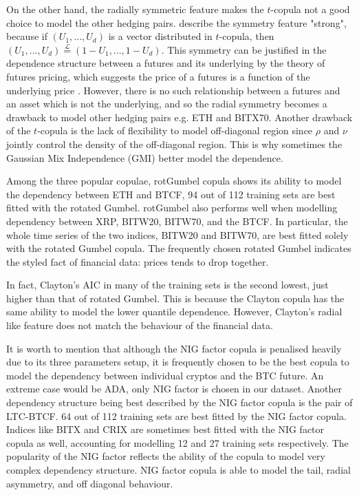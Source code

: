 On the other hand, the radially symmetric feature makes the $t$-copula not a good choice to model the other hedging pairs.
\cite{demarta2005t} describe the symmetry feature "strong", because if $(U_1, ..., U_d)$ is a vector distributed in $t$-copula,
then $(U_1, ..., U_d) \overset{\mathcal{L}}= (1-U_1, ..., 1-U_d)$.
This symmetry can be justified in the dependence structure between a futures and its underlying by the theory of futures pricing,
which suggests the price of a futures is a function of the underlying price \citep{hull2003options}.
However, there is no such relationship between a futures and an asset which is not the underlying, and so the radial symmetry becomes a drawback to model other hedging pairs e.g. ETH and BITX70.
Another drawback of the $t$-copula is the lack of flexibility to model off-diagonal region since $\rho$ and $\nu$ jointly control the density of the off-diagonal region.
This is why sometimes the Gaussian Mix Independence (GMI) better model the dependence.  \medskip

Among the three popular copulae, rotGumbel copula shows its ability to model the dependency between ETH and BTCF,
94 out of 112 training sets are best fitted with the rotated Gumbel.
rotGumbel also performs well when modelling dependency between XRP, BITW20, BITW70, and the BTCF.
In particular, the whole time series of the two indices, BITW20 and BITW70, are best fitted solely with the rotated Gumbel copula.
The frequently chosen rotated Gumbel indicates the styled fact of financial data: prices tends to drop together.  \medskip

In fact, Clayton's AIC in many of the training sets is the second lowest, just higher than that of rotated Gumbel.
This is because the Clayton copula has the same ability to model the lower quantile dependence.
However, Clayton's radial like feature does not match the behaviour of the financial data. \medskip

It is worth to mention that although the NIG factor copula is penalised heavily due to its three parameters setup,
it is frequently chosen to be the best copula to model the dependency between individual cryptos and the BTC future.
An extreme case would be ADA, only NIG factor is chosen in our dataset.
Another dependency structure being best described by the NIG factor copula is the pair of LTC-BTCF.
64 out of 112 training sets are best fitted by the NIG factor copula.
Indices like BITX and CRIX are sometimes best fitted with the NIG factor copula as well, accounting for modelling 12 and 27 training sets respectively.
The popularity of the NIG factor reflects the ability of the copula to model very complex dependency structure.
NIG factor copula is able to model the tail, radial asymmetry, and off diagonal behaviour.  \medskip %

